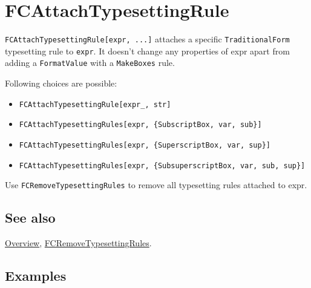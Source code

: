 \documentclass[../FeynCalcManual.tex]{subfiles}
\begin{document}
\hypertarget{fcattachtypesettingrule}{
\section{FCAttachTypesettingRule}\label{fcattachtypesettingrule}}

\texttt{FCAttachTypesettingRule[\allowbreak{}expr,\ \allowbreak{}...]}
attaches a specific \texttt{TraditionalForm} typesetting rule to
\texttt{expr}. It doesn't change any properties of expr apart from
adding a \texttt{FormatValue} with a \texttt{MakeBoxes} rule.

Following choices are possible:

\begin{itemize}
\item
  \texttt{FCAttachTypesettingRule[\allowbreak{}expr_,\ \allowbreak{}str]}
\item
  \texttt{FCAttachTypesettingRules[\allowbreak{}expr,\ \allowbreak{}\{\allowbreak{}SubscriptBox,\ \allowbreak{}var,\ \allowbreak{}sub\}]}
\item
  \texttt{FCAttachTypesettingRules[\allowbreak{}expr,\ \allowbreak{}\{\allowbreak{}SuperscriptBox,\ \allowbreak{}var,\ \allowbreak{}sup\}]}
\item
  \texttt{FCAttachTypesettingRules[\allowbreak{}expr,\ \allowbreak{}\{\allowbreak{}SubsuperscriptBox,\ \allowbreak{}var,\ \allowbreak{}sub,\ \allowbreak{}sup\}]}
\end{itemize}

Use \texttt{FCRemoveTypesettingRules} to remove all typesetting rules
attached to expr.

\subsection{See also}

\hyperlink{toc}{Overview},
\hyperlink{fcremovetypesettingrules}{FCRemoveTypesettingRules}.

\subsection{Examples}

\begin{Shaded}
\begin{Highlighting}[]
\OperatorTok{[}\OperatorTok{]}
\end{Highlighting}
\end{Shaded}
\end{document}
